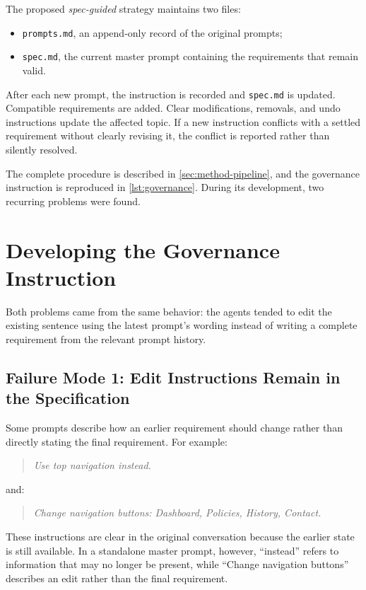 The proposed \emph{spec-guided} strategy maintains two files:

\begin{itemize}[leftmargin=*]
  \item \texttt{prompts.md}, an append-only record of the original prompts;
  \item \texttt{spec.md}, the current master prompt containing the
  requirements that remain valid.
\end{itemize}

After each new prompt, the instruction is recorded and \texttt{spec.md} is
updated. Compatible requirements are added. Clear modifications, removals,
and undo instructions update the affected topic. If a new instruction
conflicts with a settled requirement without clearly revising it, the conflict
is reported rather than silently resolved.

The complete procedure is described in \cref{sec:method-pipeline}, and the
governance instruction is reproduced in \cref{lst:governance}. During its
development, two recurring problems were found.

\section{Developing the Governance Instruction}
\label{sec:rq2-governance}

Both problems came from the same behavior: the agents tended to edit the
existing sentence using the latest prompt's wording instead of writing a
complete requirement from the relevant prompt history.

\subsection{Failure Mode 1: Edit Instructions Remain in the Specification}
\label{sec:rq2-edit-wording}

Some prompts describe how an earlier requirement should change rather than
directly stating the final requirement. For example:

\begin{quote}
  \emph{Use top navigation instead.}
\end{quote}

and:

\begin{quote}
  \emph{Change navigation buttons: Dashboard, Policies, History, Contact.}
\end{quote}

These instructions are clear in the original conversation because the earlier
state is still available. In a standalone master prompt, however, ``instead''
refers to information that may no longer be present, while ``Change
navigation buttons'' describes an edit rather than the final requirement. 

